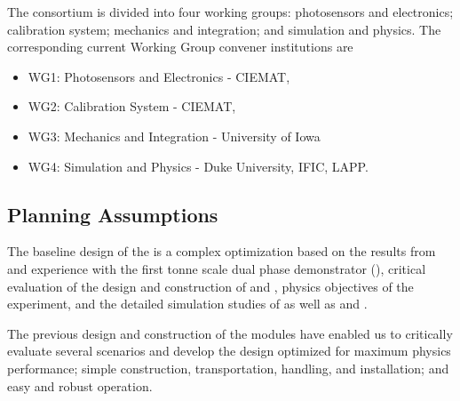 The \dual {} consortium is divided into four working groups: photosensors and electronics; calibration system; mechanics and integration; and simulation and physics. The corresponding current Working Group convener institutions are
\begin{itemize}
\item WG1: Photosensors and Electronics -  CIEMAT, %
\item WG2: Calibration System -  CIEMAT, %
\item WG3: Mechanics and Integration - University of Iowa%
\item WG4: Simulation and Physics - %
Duke University, %
IFIC, %
LAPP.
\end{itemize}





\subsection{Planning Assumptions}
\label{sec:fddp-pd-12.2}

The baseline design of the \dual {} is a complex optimization based on the results from and experience with the first tonne scale dual phase   demonstrator (), critical evaluation of the design and construction of  and , physics objectives of the \dune experiment, and the detailed simulation studies of \dune {} as well as  and .

The previous design and construction of the \dual modules have enabled us to critically evaluate several scenarios and develop the \dune {} design optimized for maximum physics performance; simple construction, transportation, handling, and installation; and easy and robust operation.

